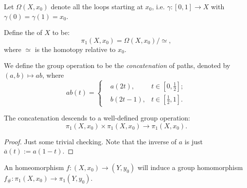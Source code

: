 \begin{definition}
	Let $\Omega(X, x_0)$ denote all the loops starting at $x_0$, i.e.
	$\gamma: [0, 1]\to X$ with $\gamma(0) = \gamma(1) = x_0$.

	Define the  of $X$ to be:
	\[
	\pi_1(X, x_0) = \Omega(X, x_0) / \simeq,
	\]
	where $\simeq$ is the homotopy relative to $x_0$.

	We define the group operation to be the \textit{concatenation} of paths,
	denoted by $(a, b)\mapsto ab$, where
	 \[
	ab(t) = \left\{\begin{aligned}
			&a(2t), & t\in [0, \frac{1}{2}];\\
			&b(2t - 1), & t\in [\frac{1}{2}, 1].
	\end{aligned}
	\right.
	\]
\end{definition}

\begin{proposition}
	The concatenation descends to a well-defined group operation:
	\[
	\pi_1(X, x_0) \times \pi_1(X, x_0) \to \pi_1(X, x_0).
	\]
\end{proposition}
\begin{proof}[Proof]
    Just some trivial checking.
	Note that the inverse of $a$ is just $\overline{a}(t) := a(1-t)$.
\end{proof}

\begin{proposition}
	An homeomorphism $f: (X, x_0)\to (Y, y_0)$ will induce a group
	homomorphism $f_\#: \pi_1(X, x_0) \to \pi_1(Y, y_0)$.
\end{proposition}
